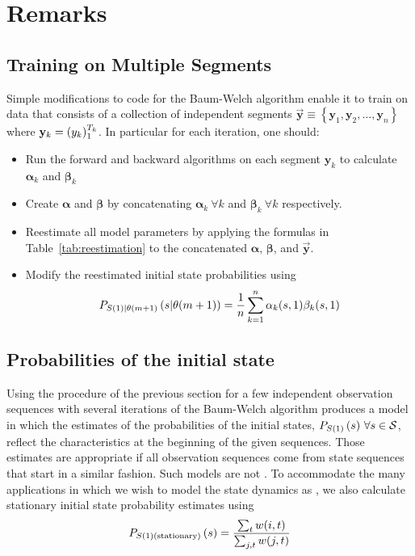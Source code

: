 \section{Remarks}
\label{sec:AlgApp}

\subsection{Training on Multiple Segments}
\label{sec:MultiSegment}


Simple modifications to code for the Baum-Welch algorithm enable it to
train on data that consists of a collection of independent segments
$\mathbf{\vec y} \equiv \left\{ \mathbf{y}_1, \mathbf{y}_2, \ldots,
  \mathbf{y}_n \right\}$ where $ \mathbf{y}_k = (y_k)_{1}^{T_k}$.
In particular for each iteration, one should:
\begin{itemize}
\item Run the forward and backward algorithms on each segment
  $\mathbf{y}_k$ to calculate ${\bm \alpha}_k$ and
  ${\bm \beta}_k$
\item Create ${\bm \alpha}$ and ${\bm \beta}$ by concatenating
  ${\bm \alpha}_k~\forall k$ and ${\bm \beta}_k~\forall k$
  respectively.
\item Reestimate all model parameters by applying the formulas in
  Table~\ref{tab:reestimation} to the concatenated  ${\bm \alpha}$,
  ${\bm \beta}$, and $\mathbf{\vec y}$.
\item Modify the reestimated initial state probabilities using
  \begin{equation*}
    P_{{S}{(1)}|{\theta}{(m+1)}} \left(s|{\theta}{(m+1)}
    \right) = \frac{1}{n} \sum_{k=1}^n \alpha_k(s,1) \beta_k(s,1)
  \end{equation*}
\end{itemize}

\subsection{Probabilities of the initial state}
\label{sec:Ps0}

Using the procedure of the previous section for a few independent
observation sequences with several iterations of the Baum-Welch
algorithm produces a model in which the estimates of the probabilities
of the initial states, $P_{\ti{S}{1}} \left(s \right)\,\forall s \in
\states$, reflect the characteristics at the beginning of the given
sequences.  Those estimates are appropriate if all observation
sequences come from state sequences that start in a similar fashion.
Such models are not .  To accommodate the many
applications in which we wish to model the state dynamics as
, we also calculate stationary initial state probability
estimates using
\begin{equation}
  \label{eq:Ps0stationary}
  P_{{S}{(1)}(\text{stationary})} \left(s \right) =
  \frac{\sum_{t}w(i,t)}{\sum_{j,t}w(j,t)}
\end{equation}



